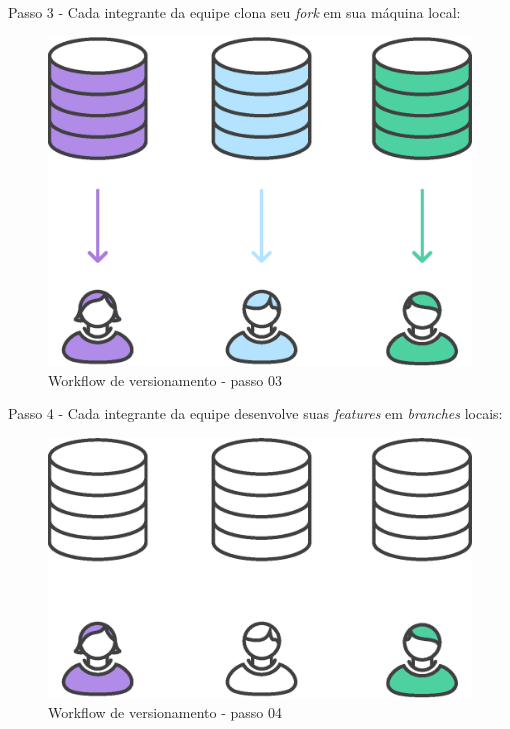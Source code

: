 Passo 3 - Cada integrante da equipe clona seu \textit{fork} em sua máquina local:
    \begin{figure}[htb]%
        \begin{center}
            \includegraphics[scale=0.2]{./imagens/forkflow3.eps}%
        \end{center}%
        \caption{Workflow de versionamento - passo 03 \label{fig:forkflow03}}%
    \end{figure}%
\newpage
Passo 4 - Cada integrante da equipe desenvolve suas \textit{features} em \textit{branches} locais:
    \begin{figure}[htb]%
        \begin{center}
            \includegraphics[scale=0.2]{./imagens/forkflow4.eps}%
        \end{center}%
        \caption{Workflow de versionamento - passo 04 \label{fig:forkflow04}}%
    \end{figure}%
    
